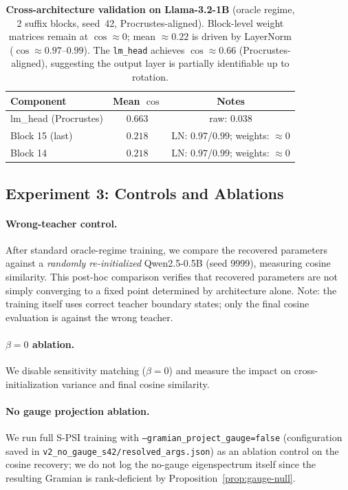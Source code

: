 \documentclass{article}
\begin{document}
\begin{table}[t]
\centering
\caption{\textbf{Cross-architecture validation on Llama-3.2-1B} (oracle regime, 2 suffix blocks, seed~42, Procrustes-aligned).  Block-level weight matrices remain at $\cos \approx 0$; mean $\approx 0.22$ is driven by LayerNorm ($\cos \approx 0.97$--$0.99$).  The \texttt{lm\_head} achieves $\cos \approx 0.66$ (Procrustes-aligned), suggesting the output layer is partially identifiable up to rotation.}
\label{tab:llama}
\small
\begin{tabular}{@{}l cc@{}}
\toprule
\textbf{Component} & \textbf{Mean $\cos$} & \textbf{Notes} \\
\midrule
lm\_head (Procrustes) & $0.663$ & raw: $0.038$ \\
Block 15 (last)       & $0.218$ & LN: $0.97$/$0.99$; weights: $\approx 0$ \\
Block 14              & $0.218$ & LN: $0.97$/$0.99$; weights: $\approx 0$ \\
\bottomrule
\end{tabular}
\end{table}

\subsection{Experiment 3: Controls and Ablations}
\label{sec:exp3}

\paragraph{Wrong-teacher control.}
After standard oracle-regime training, we compare the recovered parameters against a \emph{randomly re-initialized} Qwen2.5-0.5B (seed 9999), measuring cosine similarity.  This post-hoc comparison verifies that recovered parameters are not simply converging to a fixed point determined by architecture alone.  Note: the training itself uses correct teacher boundary states; only the final cosine evaluation is against the wrong teacher.

\paragraph{$\beta = 0$ ablation.}
We disable sensitivity matching ($\beta = 0$) and measure the impact on cross-initialization variance and final cosine similarity.

\paragraph{No gauge projection ablation.}
We run full S-PSI training with \texttt{--gramian\_project\_gauge=false} (configuration saved in \texttt{v2\_no\_gauge\_s42/resolved\_args.json}) as an ablation control on the cosine recovery; we do not log the no-gauge eigenspectrum itself since the resulting Gramian is rank-deficient by Proposition~\ref{prop:gauge-null}.
\end{document}
